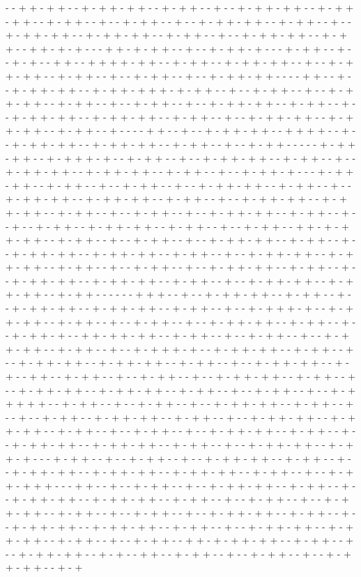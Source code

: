 - - + + - + + - - + - + + - + + - - + - + + - - + - - + - + + - + + - - + - + + - + + - - + - + + - - + - - + - + + - - + - - + - + + - + + - - + - + + - - + - - + - + + - + + - - + - + + - + + - - + - + + - - + - - + - + + - + + - - + - + + - - + + - + - + - - - + + - + - + + - - + - - + - + + - + - - - + - + + - - + - - + - + - - + + - - + + + + - + + - - + - + + - - + - + + - + + - - + - - + - + + - + + - - + - + + - - + - - + - + + - - + - - + - + + - + + - - - - + + - - + - - + - + + - + + - - + - + + - + + + - + - + + - - + - - + - + + - - + - - + - + + - + + - - + - + + - - + - - + - + + - - + - - + - + + - + + - - + - + + - - + - - + - + + - + + - - + - + + - + + - - + - + + - - + - - + - + + - + + - - + - + + - + + - - + - + + - - + - - - - + + - - + - - + - + + - + + - - + + + + - - + - - + - + + - + + - - + - + + - + + - - + - + + - - + - - + - + + - - - - - + - + + - + + - - + - + + + - + - - + - + + - - + - - + - + + - + + - - + - + + - - + - - + - + + - + + - - + - + + - + + - - + - + + - - + - - + - + + - + - - - + - + + - + + - - + - + + - - + - - + - + + - - + - - + - + + - + + - - + - + + - - + - - + - + + - + + - - + - + + - + + - - + - + + - - + - - + - + + - + + - - + - + + - + + - - + - + + - - + - - + - + + - - + - - + - + + - + + - - + - + + - - + - - + - - + - + + - - + - + + - + + - - + - + + - - + - - + - + + - - + + - + - + + - + + - - + - + + - - + - - + - + + - - + - - + - + + - + + - - + - + + - - + - - + - + + - + + - - + - + + - + + - - + - + + - - + - - + - + + - + + - - + - + + - + + - - + - + + - - + - - + - + + - - + - - + - + + - + + - - + - + + - - + - - + - + + - + + - - + - + + - + + - - + - + + - - + - - + - + + - + + - - + - + + - + + - - + - + + - - - - - - + + + - - + - - + - + + - + + - - + - + + - - + - - + - + + - + + - - + - + + - + + - - + - + + - - + - - + - + + + - + - - + - + + - + + - - + - + + - - + - - + - + + - - + - - + - + + - + + - - + - + + - - + - - + - + + - + - - + + - + + - + + - - + - + + - - + - - + - + + - - + - - + - + + - + + - - + - + + - - + - - + - + + + - + - - + - + + - + + - - + - + + - - + - - + - + + - + + - - + - + + - + + - - + - + + - - + - - + - + + - + + - - + - + - - + + - - + - + + - - + - - + - + + - - + - - + - + + - + + - - + - + + - - + - - + - + + - + + - - + - + + - + + - - + - + + - - + - - + - + + - - + - - + - + + + + + - - + - + + - - + - - + - + + - - + - - + - + + - + + - - + - + + - - + - - + - - + - + + - - + - + + - + + - - + - + + - - + - - + - + + - + + - - + - + + - + + - - + - + + - - + - - + - + + - - + - - + - + + - + + - - + - + + - - + - - + - + + - + + - - + - + + - + + - - + - + + - - + - - + - + + - + + - - + - + + - + - - - + - + + - - + - - + - + + - - + - - + - + + - + + - - + - + + - - + - - + - + + - + + - - + - + + - + + - - + - + + - + + - - + - + + - - + - - + - + + - + + + - - - + + - - + - - + - + + - - + - - + - + + - + + - - + - + + - - + - - + - + + - + + - - + - + + - + + - - + - + + - - + - - + - + + - - + - - + - + + - + + - - + - + + - - + - - + - + + - - + - - + - + + - + + - - + - + + - - + - - + - + + - + + - - + - + + - + + - - + - + + - - + - - + - + + - + + - - + - + + - + + - - + - + + - - + - - + - + + - - + + - + - + + - + + - - + - + + - - + - - + - + + - + + - - + - + - - + + - - + - + + - - + - - + - + + - - + - - + - + + - + + - - + - + 
